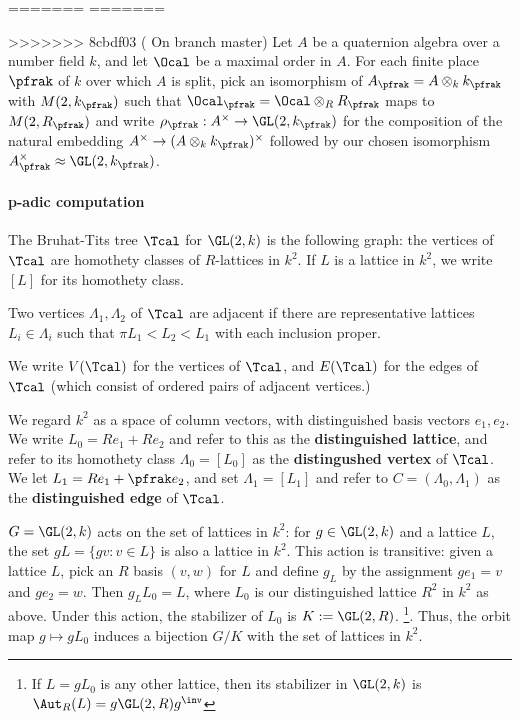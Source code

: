 \documentclass[draft]{amsart}
\begin{document}
=======
=======

>>>>>>> 8cbdf03 ( On branch master)
Let $A$ be a quaternion algebra over a number field $k$, and let $\Ocal$ be a maximal order in $A$. For each finite place $\pfrak$ of $k$ over which $A$ is split, pick an isomorphism of $A_\pfrak =A\otimes_k k_\pfrak$ with $M(2,k_\pfrak)$ such that $\Ocal_\pfrak = \Ocal \otimes_R R_\pfrak$ maps to $M(2,R_\pfrak)$ and write $\rho_\pfrak:A^\times \to \GL(2,k_\pfrak)$ for the composition of the natural embedding $A^\times \to (A\otimes_k k_\pfrak)^\times$ followed by our chosen isomorphism $A_\pfrak^\times \approx \GL(2,k_\pfrak)$.

\paragraph*{p-adic computation}
\begin{definition}
    The Bruhat-Tits tree $\Tcal$ for $\GL(2,k)$ is the following graph: the vertices of $\Tcal$ are homothety classes of $R$-lattices in $k^2$.
    If $L$ is a lattice in $k^2$, we write $[L]$ for its homothety class.

    Two vertices $\Lambda_1,\Lambda_2 $ of $\Tcal$ are adjacent if there are representative lattices $L_i \in \Lambda_i$ such that $\pi L_1 < L_2 < L_1$ with each inclusion proper.

    We write $V(\Tcal)$ for the vertices of $\Tcal$, and $E(\Tcal)$ for the edges of $\Tcal$ (which consist of ordered pairs of adjacent vertices.)
\end{definition}

We regard $k^2$ as a space of column vectors, with distinguished basis vectors $e_1,e_2$. We write $L_0 = Re_1+Re_2$ and refer to this as the \textbf{distinguished lattice}, and refer to its homothety class $\Lambda_0 = [L_0]$ as the \textbf{distingushed vertex} of $\Tcal$. We let $L_1 = Re_1 + \pfrak e_2$, and set $\Lambda_1 = [L_1]$ and refer to $C=(\Lambda_0,\Lambda_1)$ as the \textbf{distinguished edge} of $\Tcal$.

$G=\GL(2,k)$ acts on the set of lattices in $k^2$: for $g\in \GL(2,k)$ and a lattice $L$, the set $gL = \{ g v : v \in L\}$ is also a lattice in $k^2$. This action is transitive: given a lattice $L$, pick an $R$ basis $(v,w)$ for $L$ and define $g_L$ by the assignment $ge_1 = v$ and $ge_2 = w$. Then $g_L L_0 =L$, where $L_0$ is our distinguished lattice $R^2$ in $k^2$ as above. Under this action, the stabilizer of $L_0$ is $K:=\GL(2,R)$. \footnote{If $L= gL_0$ is any other lattice, then its stabilizer in $\GL(2,k)$ is $\Aut_R(L)=g \GL(2,R)g^\inv$}. Thus, the orbit map $g \mapsto gL_0$ induces a bijection $G/K$ with the set of lattices in $k^2$.
\end{document}
